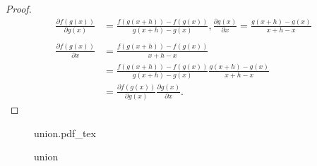 \documentclass{article}
\newtheorem{proof}{Proof}
\newcommand{\incfig}[2]{
    \def\svgwidth{#2\columnwidth}
    {#1.pdf_tex}
}
\begin{document}
\begin{proof}
    \label{pf:chain-rule}
\begin{align*}
    \frac{\partial f(g(x))}{\partial g(x)} &= \frac{f(g(x+h)) - f(g(x))}{g(x+h) - g(x)}, \frac{\partial g(x)}{\partial x} = \frac{g(x+h) - g(x)}{x+h-x} \\ \\
    \frac{\partial f(g(x))}{\partial x} &= \frac{f(g(x+h)) - f(g(x))}{x+h-x}  \\
        &=\frac{f(g(x+h)) - f(g(x))}{g(x+h) - g(x)} \frac{g(x+h) - g(x)}{x + h - x} \\
        &= \frac{\partial f(g(x))}{\partial g(x)} \frac{\partial g(x)}{\partial x} 
.\end{align*}
\end{proof}



\begin{figure}
    \center
    \incfig{union}{.4}
    \caption{union}
\end{figure}
\end{document}
